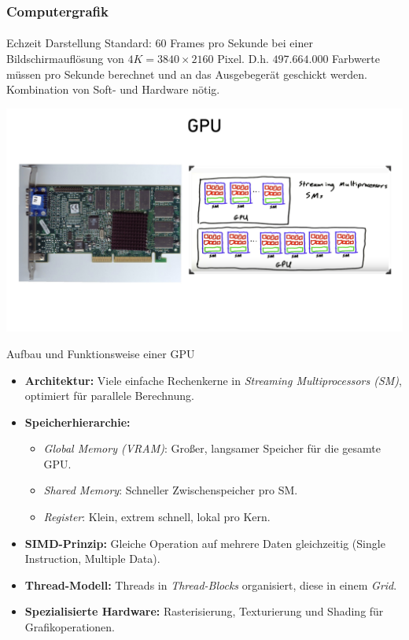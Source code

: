 \documentclass{beamer}
\begin{document}
\begin{frame}
    \frametitle{Computergrafik}
\framesubtitle{}
    \begin{block}{Echzeit Darstellung}
Standard: $60$ Frames pro Sekunde bei einer Bildschirmauflösung von $4K=3840 \times 2160$ Pixel.  
D.h. $497.664.000$ Farbwerte müssen pro Sekunde berechnet und an das Ausgebegerät
geschickt werden. 
Kombination von Soft- und Hardware nötig.
\end{block}
\includegraphics[scale=0.14]{images/Shaderday_Intro/Shaderday_Intro_004} \\

\end{frame}



\begin{frame}{Aufbau und Funktionsweise einer GPU}
    \begin{itemize}
      \item \textbf{Architektur:} Viele einfache Rechenkerne in \textit{Streaming Multiprocessors (SM)}, optimiert für parallele Berechnung.
      \item \textbf{Speicherhierarchie:}
      \begin{itemize}
        \item \textit{Global Memory (VRAM)}: Großer, langsamer Speicher für die gesamte GPU.
        \item \textit{Shared Memory}: Schneller Zwischenspeicher pro SM.
        \item \textit{Register}: Klein, extrem schnell, lokal pro Kern.
      \end{itemize}
      \item \textbf{SIMD-Prinzip:} Gleiche Operation auf mehrere Daten gleichzeitig (Single Instruction, Multiple Data).
      \item \textbf{Thread-Modell:} Threads in \textit{Thread-Blocks} organisiert, diese in einem \textit{Grid}.
      \item \textbf{Spezialisierte Hardware:} Rasterisierung, Texturierung und Shading für Grafikoperationen.
    \end{itemize}
  \end{frame}
\end{document}

